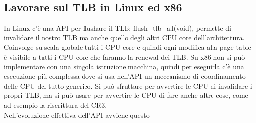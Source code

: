 \documentclass[12pt, oneside]{extbook}
\begin{document}
\subsection{Lavorare sul TLB in Linux ed x86}
In Linux c'è una API per flushare il TLB: \textsf{flush\_tlb\_all(void)}, permette di invalidare il nostro TLB ma anche quello degli altri CPU core dell'architettura. Coinvolge su scala globale tutti i CPU core e quindi ogni modifica alla page table è visibile a tutti i CPU core che faranno la renewal dei TLB. Su x86 non si può implementare con una singola istruzione macchina, quindi per eseguirla c'è una esecuzione più complessa dove si usa nell'API un meccanismo di coordinamento delle CPU del tutto generico. Si può sfruttare per avvertire le CPU di invalidare i propri TLB, ma si può usare per avvertire le CPU di fare anche altre cose, come ad esempio la riscrittura del CR3.\\ Nell'evoluzione effettiva dell'API avviene questo
\end{document}
